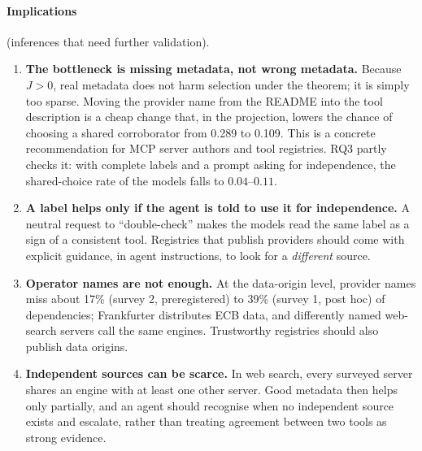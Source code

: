 \paragraph{Implications} (inferences that need further validation).
\begin{enumerate}
  \item \textbf{The bottleneck is missing metadata, not wrong metadata.} Because $J>0$, real metadata does not harm selection under the theorem; it is simply too sparse. Moving the provider name from the README into the tool description is a cheap change that, in the projection, lowers the chance of choosing a shared corroborator from 0.289 to 0.109. This is a concrete recommendation for MCP server authors and tool registries. RQ3 partly checks it: with complete labels and a prompt asking for independence, the shared-choice rate of the models falls to $0.04$--$0.11$.
  \item \textbf{A label helps only if the agent is told to use it for independence.} A neutral request to ``double-check'' makes the models read the same label as a sign of a consistent tool. Registries that publish providers should come with explicit guidance, in agent instructions, to look for a \emph{different} source.
  \item \textbf{Operator names are not enough.} At the data-origin level, provider names miss about 17\% (survey 2, preregistered) to 39\% (survey 1, post hoc) of dependencies; Frankfurter distributes ECB data, and differently named web-search servers call the same engines. Trustworthy registries should also publish data origins.
  \item \textbf{Independent sources can be scarce.} In web search, every surveyed server shares an engine with at least one other server. Good metadata then helps only partially, and an agent should recognise when no independent source exists and escalate, rather than treating agreement between two tools as strong evidence.
\end{enumerate}
